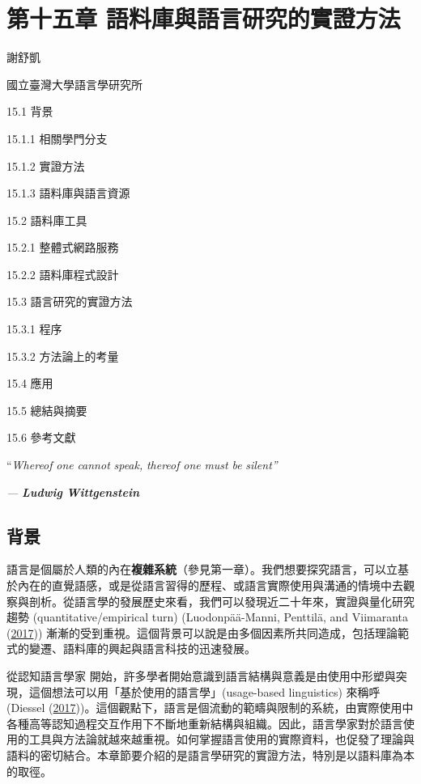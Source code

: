 
\chapter{第十五章  語料庫與語言研究的實證方法}

謝舒凱

國立臺灣大學語言學研究所

15.1 背景

15.1.1 相關學門分支

15.1.2 實證方法

15.1.3 語料庫與語言資源

15.2 語料庫工具

15.2.1 整體式網路服務

15.2.2 語料庫程式設計

15.3 語言研究的實證方法

15.3.1 程序

15.3.2 方法論上的考量

15.4 應用

15.5 總結與摘要

15.6 參考文獻

“\textit{Whereof} \textit{one} \textit{cannot} \textit{speak,} \textit{thereof} \textit{one} \textit{must} \textit{be} \textit{silent”}

\textit{{}---} \textbf{\textit{Ludwig} \textit{Wittgenstein}}

\section{背景}

語言是個屬於人類的內在\textbf{複雜系統}（參見第一章）。我們想要探究語言，可以立基於內在的直覺語感，或是從語言習得的歷程、或語言實際使用與溝通的情境中去觀察與剖析。從語言學的發展歷史來看，我們可以發現近二十年來，實證與量化研究趨勢 (quantitative/empirical turn) (Luodonpää-Manni, Penttilä, and Viimaranta (\hyperlink{bookmarkid28h4qwu}{2017})) 漸漸的受到重視。這個背景可以說是由多個因素所共同造成，包括理論範式的變遷、語料庫的興起與語言科技的迅速發展。

從認知語言學家 \citet{Langacker1987} 開始，許多學者開始意識到語言結構與意義是由使用中形塑與突現，這個想法可以用「基於使用的語言學」(usage-based linguistics) 來稱呼 (Diessel (\hyperlink{bookmarkid2grqrue}{2017}))。這個觀點下，語言是個流動的範疇與限制的系統，由實際使用中各種高等認知過程交互作用下不斷地重新結構與組織。因此，語言學家對於語言使用的工具與方法論就越來越重視。如何掌握語言使用的實際資料，也促發了理論與語料的密切結合。本章節要介紹的是語言學研究的實證方法，特別是以語料庫為本的取徑。

